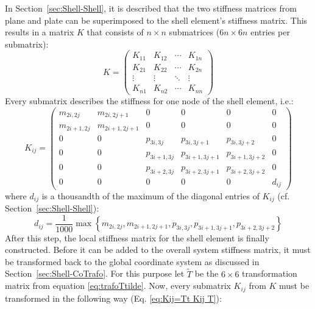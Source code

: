    In Section~\ref{sec:Shell-Shell}, it is described that the two stiffness matrices from plane and plate can be superimposed to the shell element's stiffness matrix. This results in a matrix $K$ that consists of $n\!\times\! n$ submatrices ($6n\!\times\! 6n$ entries per submatrix):
   \begin{equation*}
   K = \begin{pmatrix}
   K_{11} & K_{12} & \cdots & K_{1n}\\
   K_{21} & K_{22} & \cdots & K_{2n}\\
   \vdots & \vdots & \ddots & \vdots\\
   K_{n1} & K_{n2} & \cdots & K_{nn}
   \end{pmatrix}
   \end{equation*}
   Every submatrix describes the stiffness for one node of the shell element, i.e.:
   \begin{equation*}
   K_{ij} = \begin{pmatrix}
   m_{2i,2j}   & m_{2i,2j+1}   & 0           & 0             & 0             & 0\\
   m_{2i+1,2j} & m_{2i+1,2j+1} & 0           & 0             & 0             & 0\\
   0           & 0             & p_{3i,3j}   & p_{3i,3j+1}   & p_{3i,3j+2}   & 0\\
   0           & 0             & p_{3i+1,3j} & p_{3i+1,3j+1} & p_{3i+1,3j+2} & 0\\
   0           & 0             & p_{3i+2,3j} & p_{3i+2,3j+1} & p_{3i+2,3j+2} & 0\\
   0           & 0             & 0           & 0             & 0             & d_{ij}
   \end{pmatrix}
   \end{equation*}
   where $d_{ij}$ is a thousandth of the maximum of the diagonal entries of $K_{ij}$ (cf. Section~\ref{sec:Shell-Shell}):
   \begin{equation*}
   d_{ij} = \frac{1}{1000}\max \left\lbrace m_{2i,2j}, m_{2i+1,2j+1}, p_{3i,3j}, p_{3i+1,3j+1}, p_{3i+2,3j+2} \right\rbrace 
   \end{equation*}
   After this step, the local stiffness matrix for the shell element is finally constructed. Before it can be added to the overall system stiffness matrix, it must be transformed back to the global coordinate system as discussed in Section~\ref{sec:Shell-CoTrafo}.
   For this purpose let $\tilde{T}$ be the $6\!\times\! 6$ transformation matrix from equation \eqref{eq:trafoTtilde}. Now, every submatrix $K_{ij}$ from $K$ must be transformed in the following way (Eq. \eqref{eq:Kij=Tt Kij T}):
